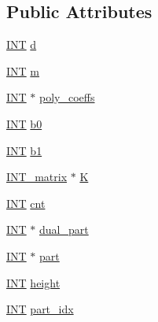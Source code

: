 \subsection*{Public Attributes}
\begin{DoxyCompactItemize}
\item 
\mbox{\hyperlink{galois_8h_a09fddde158a3a20bd2dcadb609de11dc}{I\+NT}} \mbox{\hyperlink{classmatrix__block__data_a9d5d10ae71335d3826d65139210806dc}{d}}
\item 
\mbox{\hyperlink{galois_8h_a09fddde158a3a20bd2dcadb609de11dc}{I\+NT}} \mbox{\hyperlink{classmatrix__block__data_a995295255d9a4fb59c5c0e9cee166331}{m}}
\item 
\mbox{\hyperlink{galois_8h_a09fddde158a3a20bd2dcadb609de11dc}{I\+NT}} $\ast$ \mbox{\hyperlink{classmatrix__block__data_a88d446c8ef6f98ac6c977e8fb13601f4}{poly\+\_\+coeffs}}
\item 
\mbox{\hyperlink{galois_8h_a09fddde158a3a20bd2dcadb609de11dc}{I\+NT}} \mbox{\hyperlink{classmatrix__block__data_ab73f03d6ab3b15bff91e84c3fb288ccc}{b0}}
\item 
\mbox{\hyperlink{galois_8h_a09fddde158a3a20bd2dcadb609de11dc}{I\+NT}} \mbox{\hyperlink{classmatrix__block__data_af2698cfae731407400ba4cd21490351f}{b1}}
\item 
\mbox{\hyperlink{class_i_n_t__matrix}{I\+N\+T\+\_\+matrix}} $\ast$ \mbox{\hyperlink{classmatrix__block__data_a8d7993ed2022696454d89e01c4279729}{K}}
\item 
\mbox{\hyperlink{galois_8h_a09fddde158a3a20bd2dcadb609de11dc}{I\+NT}} \mbox{\hyperlink{classmatrix__block__data_a4cb1bdbeef4bad42abcc06c2978ebe4d}{cnt}}
\item 
\mbox{\hyperlink{galois_8h_a09fddde158a3a20bd2dcadb609de11dc}{I\+NT}} $\ast$ \mbox{\hyperlink{classmatrix__block__data_a0538c09ac472cb63538af88392dc5e6b}{dual\+\_\+part}}
\item 
\mbox{\hyperlink{galois_8h_a09fddde158a3a20bd2dcadb609de11dc}{I\+NT}} $\ast$ \mbox{\hyperlink{classmatrix__block__data_a74844ebca3f0a61e1efa6fe51aad6dfc}{part}}
\item 
\mbox{\hyperlink{galois_8h_a09fddde158a3a20bd2dcadb609de11dc}{I\+NT}} \mbox{\hyperlink{classmatrix__block__data_a608152aa883a6a755dd85dc2c8d97b8c}{height}}
\item 
\mbox{\hyperlink{galois_8h_a09fddde158a3a20bd2dcadb609de11dc}{I\+NT}} \mbox{\hyperlink{classmatrix__block__data_a73d525a1e41135491814a85e5e3b5bd4}{part\+\_\+idx}}
\end{DoxyCompactItemize}


